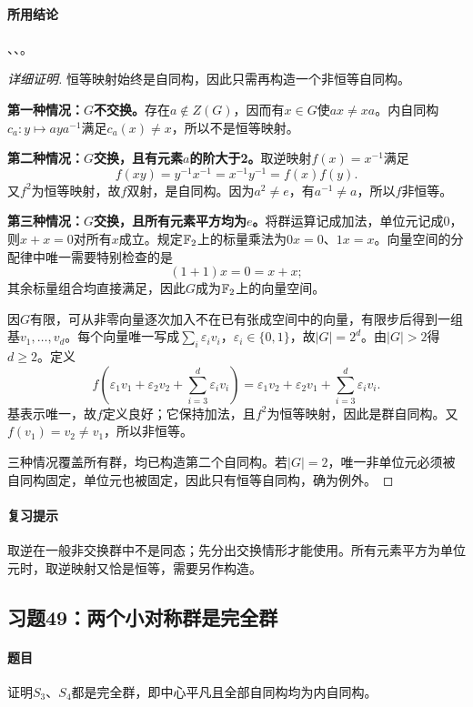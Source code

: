 \paragraph{所用结论}、、。
\begin{proof}[详细证明]
恒等映射始终是自同构，因此只需再构造一个非恒等自同构。

\textbf{第一种情况：$G$不交换。}存在$a\notin Z(G)$，因而有$x\in G$使$ax\ne xa$。内自同构$c_a:y\mapsto aya^{-1}$满足$c_a(x)\ne x$，所以不是恒等映射。

\textbf{第二种情况：$G$交换，且有元素$a$的阶大于2。}取逆映射$f(x)=x^{-1}$满足
\[
f(xy)=y^{-1}x^{-1}=x^{-1}y^{-1}=f(x)f(y).
\]
又$f^2$为恒等映射，故$f$双射，是自同构。因为$a^2\ne e$，有$a^{-1}\ne a$，所以$f$非恒等。

\textbf{第三种情况：$G$交换，且所有元素平方均为$e$。}将群运算记成加法，单位元记成0，则$x+x=0$对所有$x$成立。规定$\mathbb F_2$上的标量乘法为$0x=0$、$1x=x$。向量空间的分配律中唯一需要特别检查的是
\[
(1+1)x=0=x+x;
\]
其余标量组合均直接满足，因此$G$成为$\mathbb F_2$上的向量空间。

因$G$有限，可从非零向量逐次加入不在已有张成空间中的向量，有限步后得到一组基$v_1,\ldots,v_d$。每个向量唯一写成$\sum_i\varepsilon_iv_i$，$\varepsilon_i\in\{0,1\}$，故$|G|=2^d$。由$|G|>2$得$d\ge2$。定义
\[
f\left(\varepsilon_1v_1+\varepsilon_2v_2+\sum_{i=3}^d\varepsilon_iv_i\right)
=\varepsilon_1v_2+\varepsilon_2v_1+\sum_{i=3}^d\varepsilon_iv_i.
\]
基表示唯一，故$f$定义良好；它保持加法，且$f^2$为恒等映射，因此是群自同构。又$f(v_1)=v_2\ne v_1$，所以非恒等。

三种情况覆盖所有群，均已构造第二个自同构。若$|G|=2$，唯一非单位元必须被自同构固定，单位元也被固定，因此只有恒等自同构，确为例外。
\end{proof}
\paragraph{复习提示}取逆在一般非交换群中不是同态；先分出交换情形才能使用。所有元素平方为单位元时，取逆映射又恰是恒等，需要另作构造。

\subsection{习题49：两个小对称群是完全群}
\paragraph{题目}证明$S_3$、$S_4$都是完全群，即中心平凡且全部自同构均为内自同构。
